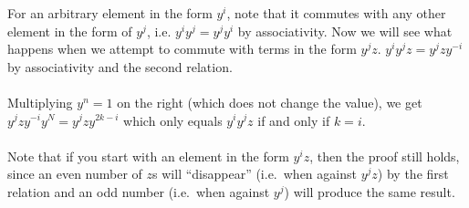 \documentclass[letterpaper]{article}
\begin{document}
For an arbitrary element in the form $ y^i $, note that it commutes with any other element in the form of $ y^j $, i.e. $ y^i y^j = y^j y^i $ by associativity.
Now we will see what happens when we attempt to commute with terms in the form $ y^j z $.
$ y^i y^j z = y^j z y^{-i} $ by associativity and the second relation.
\\ \\
Multiplying $ y^n = 1 $ on the right (which does not change the value), we get $ y^j z y^{-i} y^N = y^j z y^{2k - i} $ which only equals $ y^i y^j z $ if and only if $ k = i $.
\\ \\
Note that if you start with an element in the form $ y^i z $, then the proof still holds, since an even number of $ z $s will ``disappear'' (i.e.\ when against $ y^j z $) by the first relation and an odd number (i.e.\ when against $ y^j $) will produce the same result.
\end{document}
